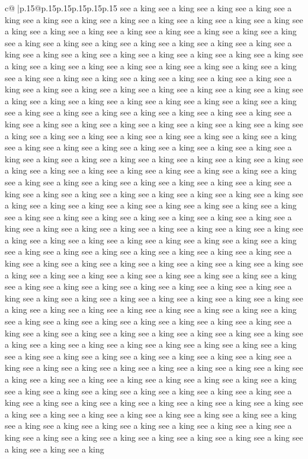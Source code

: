 \documentclass{article}
\begin{document}
{\begin{supertabular}{c@{$\;$}|p{.15\linewidth}@{}p{.15\linewidth}p{.15\linewidth}p{.15\linewidth}p{.15\linewidth}p{.15\linewidth}}
{{{see a king see a king see a king see a king see a king see a king see a king see a king see a king see a king see a king see a king see a king see a king see a king see a king see a king see a king see a king see a king see a king see a king see a king see a king see a king see a king see a king see a king see a king see a king see a king see a king see a king see a king see a king see a king see a king see a king see a king see a king see a king see a king see a king see a king see a king see a king see a king see a king see a king see a king see a king see a king see a king see a king see a king see a king see a king see a king see a king see a king see a king see a king see a king see a king see a king see a king see a king see a king see a king see a king see a king see a king see a king see a king see a king see a king see a king see a king see a king see a king see a king see a king see a king see a king see a king see a king see a king see a king see a king see a king see a king see a king see a king see a king see a king see a king see a king see a king see a king see a king see a king see a king see a king see a king see a king see a king see a king see a king see a king see a king see a king see a king see a king see a king see a king see a king see a king see a king see a king see a king see a king see a king see a king see a king see a king see a king see a king see a king see a king see a king see a king see a king see a king see a king see a king see a king see a king see a king see a king see a king see a king see a king see a king see a king see a king see a king see a king see a king see a king see a king see a king see a king see a king see a king see a king see a king see a king see a king see a king see a king see a king see a king see a king see a king see a king see a king see a king see a king see a king see a king see a king see a king see a king see a king see a king see a king see a king see a king see a king see a king see a king see a king see a king see a king see a king see a king see a king see a king see a king see a king see a king see a king see a king see a king see a king see a king see a king see a king see a king see a king see a king see a king see a king see a king see a king see a king see a king see a king see a king see a king see a king see a king see a king see a king see a king see a king see a king see a king see a king see a king see a king see a king see a king see a king see a king see a king see a king see a king see a king see a king see a king see a king see a king see a king see a king see a king see a king see a king see a king see a king see a king see a king see a king see a king see a king see a king see a king see a king see a king see a king see a king see a king see a king see a king see a king see a king see a king see a king see a king see a king see a king see a king see a king see a king see a king see a king see a king see a king see a king see a king see a king see a king see a king see a king see a king see a king see a king see a king see a king see a king see a king see a king see a king see a king see a king see a king see a king see a king see a king see a king see a king }}}
\end{supertabular}}
\end{document}
